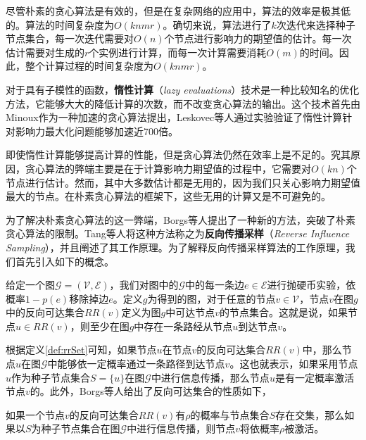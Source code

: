 尽管朴素的贪心算法是有效的，但是在复杂网络的应用中，算法的效率是极其低的。算法的时间复杂度为$O\left(knmr\right)$。确切来说，算法进行了$k$次迭代来选择种子节点集合，每一次迭代需要对$O\left(n\right)$个节点进行影响力的期望值的估计。每一次估计需要对生成的$r$个实例进行计算，而每一次计算需要消耗$O\left(m\right)$的时间。因此，整个计算过程的时间复杂度为$O\left(knmr\right)$。

对于具有子模性的函数，\textbf{惰性计算}（\textit{lazy evaluations}）技术是一种比较知名的优化方法，它能够大大的降低计算的次数，而不改变贪心算法的输出。这个技术首先由Minoux作为一种加速的贪心算法提出，Leskovec等人通过实验验证了惰性计算针对影响力最大化问题能够加速近700倍。

即使惰性计算能够提高计算的性能，但是贪心算法仍然在效率上是不足的。究其原因，贪心算法的弊端主要是在于计算影响力期望值的过程中，它需要对$O\left(kn\right)$个节点进行估计。然而，其中大多数估计都是无用的，因为我们只关心影响力期望值最大的节点。在朴素贪心算法的框架下，这些无用的计算又是不可避免的。

为了解决朴素贪心算法的这一弊端，Borgs等人提出了一种新的方法，突破了朴素贪心算法的限制。Tang等人将这种方法称之为\textbf{反向传播采样}（\textit{Reverse Influence Sampling}），并且阐述了其工作原理。为了解释反向传播采样算法的工作原理，我们首先引入如下的概念。

\begin{mydef}[反向可达集合]\label{def:rrSet}
给定一个图$\mathcal{G}=\left(\mathcal{V}, \mathcal{E}\right)$，我们对图中的$\mathcal{G}$中的每一条边$e \in \mathcal{E}$进行抛硬币实验，依概率$1-p\left(e\right)$移除掉边$e$。定义$g$为得到的图，对于任意的节点$v \in \mathcal{V}$，节点$v$在图$g$中的反向可达集合${RR}\left(v\right)$定义为图$g$中可达节点$v$的节点集合。这就是说，如果节点$u \in {RR}\left(v\right)$，则至少在图$g$中存在一条路经从节点$u$到达节点$v$。
\end{mydef}

根据定义\ref{def:rrSet}可知，如果节点$u$在节点$v$的反向可达集合${RR}\left(v\right)$中，那么节点$u$在图$\mathcal{G}$中能够依一定概率通过一条路径到达节点$v$。这也就表示，如果采用节点$u$作为种子节点集合$S=\{u\}$在图$\mathcal{G}$中进行信息传播，那么节点$u$是有一定概率激活节点$v$的。此外，Borgs等人给出了反向可达集合的性质如下，

\begin{mylem}\label{lem:rrSet}
如果一个节点$v$的反向可达集合${RR}\left(v\right)$有$\rho$的概率与节点集合$S$存在交集，那么如果以$S$为种子节点集合在图$\mathcal{G}$中进行信息传播，则节点$v$将依概率$\rho$被激活。
\end{mylem}

